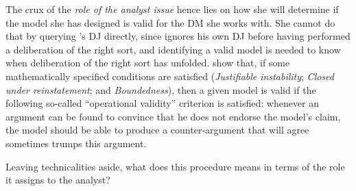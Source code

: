 \documentclass[version=3.21, pagesize, twoside=off, bibliography=totoc, DIV=calc, fontsize=12pt, a4paper, french, english]{scrartcl}
\begin{document}
The crux of the \emph{role of the analyst issue} hence lies on how she will determine if the model she has designed is valid for the \ac{DM} she works with. She cannot do that by querying \thedm’s \ac{DJ} directly, since \thedm{} ignores his own \ac{DJ} before having performed a deliberation of the right sort, and identifying a valid model is needed to know when deliberation of the right sort has unfolded. \citet{cailloux_formal_2019} show that, if some mathematically specified conditions are satisfied (\emph{Justifiable instability}; \emph{Closed under reinstatement}; and \emph{Boundedness}), then  a given model is valid  if the following so-called “operational validity” criterion is satisfied: whenever an argument can be found to convince \thedm{} that he does not endorse the model’s claim, the model should be able to produce a counter-argument that \thedm{} will agree sometimes trumps this argument.

Leaving technicalities aside, what does this procedure means in terms of the role it assigns to the analyst?
\end{document}

